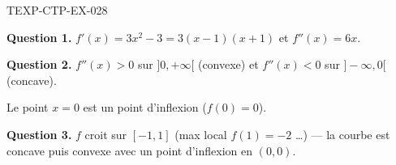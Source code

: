 \begin{corrige}{TEXP-CTP-EX-028}

\textbf{Question 1.} $f'(x) = 3x^2 - 3 = 3(x-1)(x+1)$ et $f''(x) = 6x$.


\textbf{Question 2.} $f''(x) > 0$ sur $]0,+\infty[$ (convexe) et $f''(x) < 0$ sur $]-\infty,0[$ (concave).

Le point $x=0$ est un point d'inflexion ($f(0) = 0$).

\textbf{Question 3.} $f$ croit sur $[-1,1]$ (max local $f(1)=-2$ \ldots) — la courbe est concave puis convexe avec un point d'inflexion en $(0,0)$.

\end{corrige}
